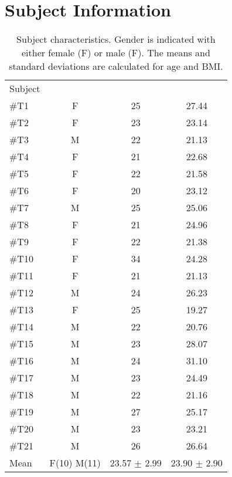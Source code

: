 \chapter{Subject Information} \label{SubjectINFO}

\begin{longtable}{l|c|c|c}
	\caption{Subject characteristics. Gender is indicated with either female (F) or male (F). The means and standard deviations are calculated for age and BMI.}
	\label{tab:subjectsA} \\
\cellcolor[HTML]{C0C0C0} {Subject} & 
\cellcolor[HTML]{C0C0C0}{Age} & \cellcolor[HTML]{C0C0C0}{Gender}  & \cellcolor[HTML]{C0C0C0}{BMI}  	\\  \rule{0pt}{3ex} 
\#T1 & F  & 25  & 27.44  \\ \hline \hline \rule{0pt}{3ex} 
\#T2 & F & 23 & 23.14  \\ \hline \hline \rule{0pt}{3ex} 
\#T3 & M & 22 & 21.13  \\ \hline \hline \rule{0pt}{3ex} 
\#T4 & F & 21  & 22.68  \\ \hline \hline \rule{0pt}{3ex} 
\#T5 & F & 22 & 21.58   \\ \hline \hline \rule{0pt}{3ex} 
\#T6 & F & 20 & 23.12 \\ \hline \hline \rule{0pt}{3ex} 
\#T7 & M & 25  & 25.06  \\ \hline \hline \rule{0pt}{3ex} 
	\#T8 & F & 21 & 24.96  \\ \hline \hline \rule{0pt}{3ex} 
	\#T9 & F & 22 & 21.38   \\ \hline \hline \rule{0pt}{3ex} 
	\#T10 & F & 34 & 24.28  \\ \hline \hline \rule{0pt}{3ex} 
	\#T11 & F & 21 & 21.13 \\ \hline \hline \rule{0pt}{3ex} 
\#T12 & M  & 24  & 26.23\\ \hline \hline \rule{0pt}{3ex} 
\#T13 &  F & 25 & 19.27 \\ \hline \hline \rule{0pt}{3ex} 
\#T14 & M  & 22 & 20.76  \\ \hline \hline \rule{0pt}{3ex} 
\#T15 & M & 23 & 28.07  \\ \hline \hline \rule{0pt}{3ex} 
\#T16 & M & 24 & 31.10 \\ \hline \hline \rule{0pt}{3ex} 
\#T17 & M & 23 & 24.49  \\ \hline \hline \rule{0pt}{3ex} 
	\#T18 & M & 22 & 21.16 \\ \hline \hline \rule{0pt}{3ex} 
	\#T19 & M & 27 & 25.17 \\ \hline \hline \rule{0pt}{3ex} 
	\#T20 & M & 23  & 23.21  \\ \hline \hline \rule{0pt}{3ex}
		\#T21 & M & 26 & 26.64   \\ \hline \hline \rule{0pt}{3ex} 
	Mean & F(10) M(11) & 23.57 $\pm$ 2.99  & 23.90 $\pm$ 2.90
	\\ \hline 
\end{longtable}
\vspace{-.5cm}


